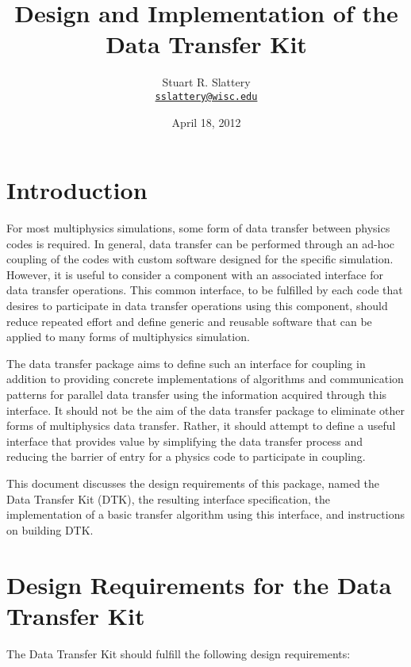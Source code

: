 \documentclass[letterpaper]{article}
\author{Stuart R. Slattery
  \\ \href{mailto:sslattery@wisc.edu}{\texttt{sslattery@wisc.edu}}
}
\date{April 18, 2012}
\title{Design and Implementation of the Data Transfer Kit}
\begin{document}
\maketitle
\newpage

\section{Introduction}
For most multiphysics simulations, some form of data transfer between
physics codes is required. In general, data transfer can be performed
through an ad-hoc coupling of the codes with custom software designed
for the specific simulation. However, it is useful to consider a
component with an associated interface for data transfer
operations. This common interface, to be fulfilled by each code that
desires to participate in data transfer operations using this
component, should reduce repeated effort and define generic and
reusable software that can be applied to many forms of multiphysics
simulation.

The data transfer package aims to define such an interface for
coupling in addition to providing concrete implementations of
algorithms and communication patterns for parallel data transfer using
the information acquired through this interface. It should not be the
aim of the data transfer package to eliminate other forms of
multiphysics data transfer. Rather, it should attempt to define a
useful interface that provides value by simplifying the data transfer
process and reducing the barrier of entry for a physics code to
participate in coupling.

This document discusses the design requirements of this package, named
the Data Transfer Kit (DTK), the resulting interface specification,
the implementation of a basic transfer algorithm using this interface,
and instructions on building DTK.

\section{Design Requirements for the Data Transfer Kit}
The Data Transfer Kit should fulfill the following design
requirements:
\end{document}
